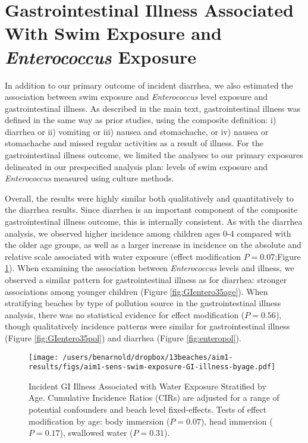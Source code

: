 \documentclass[12pt]{article}\usepackage[]{graphicx}\usepackage[]{color}
\begin{document}
\section{Gastrointestinal Illness Associated With Swim Exposure and \textit{Enterococcus} Exposure}

In addition to our primary outcome of incident diarrhea, we also estimated the association between swim exposure and \textit{Enterococcus} level exposure and gastrointestinal illness. As described in the main text, gastrointestinal illness was defined in the same way as prior studies,\supercite{Wade2010-bb,Wade2010-ps,Colford2012-um,Arnold2013-xd,Yau2014-pl} using the composite definition: i) diarrhea or ii) vomiting or iii) nausea and stomachache, or iv) nausea or stomachache and missed regular activities as a result of illness.  For the gastrointestinal illness outcome, we limited the analyses to our primary exposures delineated in our prespecified analysis plan: levels of swim exposure and \textit{Enterococcus} measured using culture methods.

Overall, the results were highly similar both qualitatively and quantitatively to the diarrhea results. Since diarrhea is an important component of the composite gastrointestinal illness outcome, this is internally consistent.  As with the diarrhea analysis, we observed higher incidence among children ages 0-4 compared with the older age groups, as well as a larger increase in incidence on the absolute and relative scale associated with water exposure (effect modification $P=0.07$;Figure \ref{fig:GIswimex}).  When examining the association between \textit{Enterococcus} levels and illness, we observed a similar pattern for gastrointestinal illness as for diarrhea: stronger associations among younger children (Figure \ref{fig:GIentero35age}). When stratifying beaches by type of pollution source in the gastrointestinal illness analysis, there was no statistical evidence for effect modification ($P=0.56$), though qualitatively incidence patterns were similar for gastrointestinal illness (Figure \ref{fig:GIentero35pol}) and diarrhea (Figure \ref{fig:enteropol}).

\begin{landscape}
\begin{figure}[htbp]
\begin{center}
\texttt{[image: /users/benarnold/dropbox/13beaches/aim1-results/figs/aim1-sens-swim-exposure-GI-illness-byage.pdf]}
\begin{minipage}{1.2\textwidth}
\caption{Incident GI Illness Associated with Water Exposure Stratified by Age. Cumulative Incidence Ratios (CIRs) are adjusted for a range of potential confounders and beach level fixed-effects. Tests of effect modification by age: body immersion ($P=0.07$), head immersion ($P=0.17$), swallowed water ($P=0.31$).}
\label{fig:GIswimex}
\end{minipage}
\end{center}
\end{figure}
\end{landscape}
\end{document}
